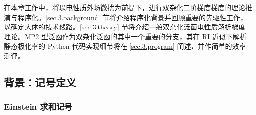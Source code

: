 在本章工作中，将以电性质外场微扰为前提下，进行双杂化二阶梯度梯度的理论推演与程序化。\ref{sec.3.background} 节将介绍程序化背景并回顾重要的先驱性工作，以确定大体的技术线路。\ref{sec.3.theory} 节将介绍一般双杂化泛函电性质解析梯度理论。MP2 型泛函作为双杂化泛函的其中一个重要的分支，其在 RI 近似下解析静态极化率的 Python 代码实现细节将在 \ref{sec.3.program} 阐述，并作简单的效率测评。

\subsection{背景：记号定义}

\subsubsection{Einstein 求和记号}

